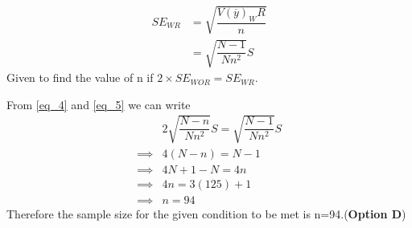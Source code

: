 \documentclass[journal,12pt,twocolumn]{IEEEtran}
\begin{document}
\begin{align}
{SE}_{WR} & = \sqrt{\dfrac{V(\overline{y})_WR}{n}}\\
& = \sqrt{\dfrac{N-1}{Nn^2}}S \label{eq_5}
\end{align}
Given to find the value of n if $2 \times {SE}_{WOR} =  {SE}_{WR}$.

From \eqref{eq_4} and \eqref{eq_5} we can write 
\begin{align}
& 2\sqrt{\dfrac{N-n}{Nn^2}}S= \sqrt{\dfrac{N-1}{Nn^2}}S\\
\implies & 4(N-n) = N-1\\
\implies & 4N+1-N=4n\\
\implies & 4n=3(125)+1\\
\implies & n=94
\end{align}
Therefore the sample size for the given condition to be met is n=94.(\textbf{Option D})
\end{document}
